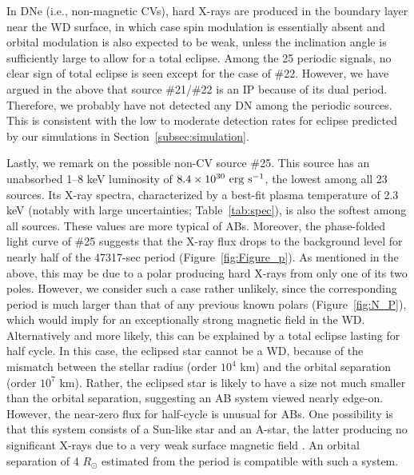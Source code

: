 \documentclass[fleqn,usenatbib]{mnras}
\begin{document}
In DNe (i.e., non-magnetic CVs), hard X-rays are produced in the boundary layer near the WD surface, in which case spin modulation is essentially absent and orbital modulation is also expected to be weak, unless the inclination angle is sufficiently large to allow for a total eclipse. Among the 25 periodic signals, no clear sign of total eclipse is seen except for the case of \#22. However, we have argued in the above that source \#21/\#22 is an IP because of its dual period. Therefore, we probably have not detected any DN among the periodic sources. This is consistent with the low to moderate detection rates for eclipse predicted by our simulations in Section~\ref{subsec:simulation}. 

Lastly, we remark on the possible non-CV source \#25. This source has an unabsorbed 1--8 keV luminosity of $\rm 8.4 \times 10^{30}~erg~s^{-1}$, the lowest among all 23 sources. Its X-ray spectra, characterized by a best-fit plasma temperature of 2.3 keV (notably with large uncertainties; Table~\ref{tab:spec}), is also the softest among all sources.
These values are more typical of ABs. 
Moreover, the phase-folded light curve of \#25 suggests that the X-ray flux drops to the background level for nearly half of the 47317-sec period (Figure~\ref{fig:Figure_p}). 
As mentioned in the above, this may be due to a polar producing hard X-rays from only one of its two poles.
However, we consider such a case rather unlikely, since the corresponding period is much larger than that of any previous known polars (Figure~\ref{fig:N_P}), which would imply for an exceptionally strong magnetic field in the WD. 
Alternatively and more likely, this can be explained by a total eclipse lasting for half cycle.
In this case, the eclipsed star cannot be a WD, because of the mismatch between the stellar radius (order $10^4$ km)
and the orbital separation (order $10^7$ km).
Rather, the eclipsed star is likely to have a size not much smaller than the orbital separation, suggesting an AB system viewed nearly edge-on.
However, the near-zero flux for half-cycle is unusual for ABs. One possibility is that this system consists of a Sun-like star and an A-star, the latter producing no significant X-rays due to a very weak surface magnetic field \citep{2004A&ARv..12...71G}. 
An orbital separation of 4 $R_\odot$ estimated from the period is compatible with such a system. 
\end{document}
